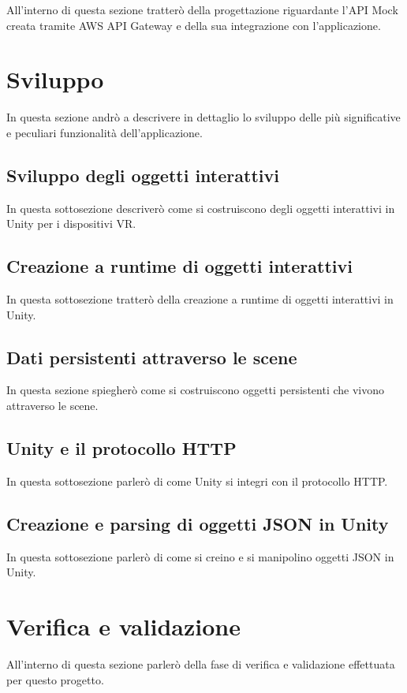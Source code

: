 All'interno di questa sezione tratterò della progettazione riguardante l'API Mock creata tramite AWS API Gateway e della sua integrazione con l'applicazione.

\section{Sviluppo}

In questa sezione andrò a descrivere in dettaglio lo sviluppo delle più significative e peculiari funzionalità dell'applicazione.

\subsection{Sviluppo degli oggetti interattivi}

In questa sottosezione descriverò come si costruiscono degli oggetti interattivi in Unity per i dispositivi VR.

\subsection{Creazione a runtime di oggetti interattivi}

In questa sottosezione tratterò della creazione a runtime di oggetti interattivi in Unity.

\subsection{Dati persistenti attraverso le scene}

In questa sezione spiegherò come si costruiscono oggetti persistenti che vivono attraverso le scene.

\subsection{Unity e il protocollo HTTP}

In questa sottosezione parlerò di come Unity si integri con il protocollo HTTP.

\subsection{Creazione e parsing di oggetti JSON in Unity}

In questa sottosezione parlerò di come si creino e si manipolino oggetti JSON in Unity.

\section{Verifica e validazione}

All'interno di questa sezione parlerò della fase di verifica e validazione effettuata per questo progetto.
